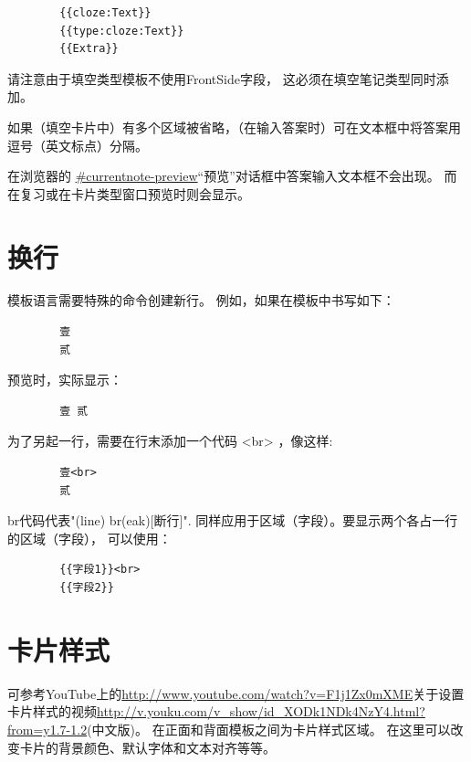 \documentclass[a4paper]{book}
\begin{document}
	\begin{shaded}\begin{verbatim}
		{{cloze:Text}}
		{{type:cloze:Text}}
		{{Extra}}
		\end{verbatim}\end{shaded}
	请注意由于填空类型模板不使用FrontSide字段， 这必须在填空笔记类型同时添加。
	
	如果（填空卡片中）有多个区域被省略，（在输入答案时）可在文本框中将答案用逗号（英文标点）分隔。
	
	
	
	\begin{shaded}
		在浏览器的 \url{#currentnote-preview}“预览”对话框中答案输入文本框不会出现。 而在复习或在卡片类型窗口预览时则会显示。
	\end{shaded}
	
	\section{换行}
	模板语言需要特殊的命令创建新行。 例如，如果在模板中书写如下：
	
	\begin{shaded}\begin{verbatim}
		壹
		贰
		\end{verbatim}\end{shaded}
	预览时，实际显示：
	\begin{shaded}\begin{verbatim}
		壹 贰
		\end{verbatim}\end{shaded}
	为了另起一行，需要在行末添加一个代码 <br> ，像这样:
	\begin{shaded}\begin{verbatim}
		壹<br>
		贰
		\end{verbatim}\end{shaded}
	br代码代表"(line) br(eak)[断行]".
	同样应用于区域（字段）。要显示两个各占一行的区域（字段）， 可以使用：
	
	\begin{shaded}\begin{verbatim}
		{{字段1}}<br>
		{{字段2}}
		\end{verbatim}\end{shaded}
	\section{卡片样式}
	可参考YouTube上的\url{http://www.youtube.com/watch?v=F1j1Zx0mXME}关于设置卡片样式的视频\url{http://v.youku.com/v_show/id_XODk1NDk4NzY4.html?from=y1.7-1.2}(中文版)。
	在正面和背面模板之间为卡片样式区域。 在这里可以改变卡片的背景颜色、默认字体和文本对齐等等。
	
\end{document}
